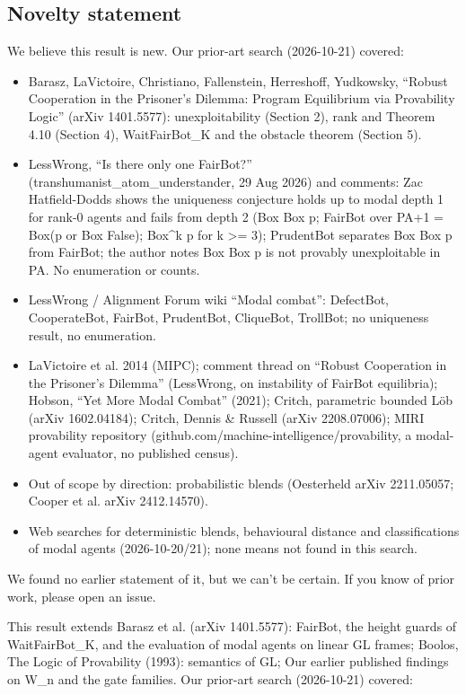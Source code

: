 \documentclass{article}
\begin{document}
\subsection*{Novelty statement}

We believe this result is new. Our prior-art search (2026-10-21) covered:

\begin{itemize}
\item Barasz, LaVictoire, Christiano, Fallenstein, Herreshoff, Yudkowsky, ``Robust Cooperation in the Prisoner's Dilemma: Program Equilibrium via Provability Logic'' (arXiv 1401.5577): unexploitability (Section 2), rank and Theorem 4.10 (Section 4), WaitFairBot\_K and the obstacle theorem (Section 5).
\item LessWrong, ``Is there only one FairBot?'' (transhumanist\_atom\_understander, 29 Aug 2026) and comments: Zac Hatfield-Dodds shows the uniqueness conjecture holds up to modal depth 1 for rank-0 agents and fails from depth 2 (Box Box p; FairBot over PA+1 = Box(p or Box False); Box\textasciicircum{}k p for k \textgreater{}= 3); PrudentBot separates Box Box p from FairBot; the author notes Box Box p is not provably unexploitable in PA. No enumeration or counts.
\item LessWrong / Alignment Forum wiki ``Modal combat'': DefectBot, CooperateBot, FairBot, PrudentBot, CliqueBot, TrollBot; no uniqueness result, no enumeration.
\item LaVictoire et al. 2014 (MIPC); comment thread on ``Robust Cooperation in the Prisoner's Dilemma'' (LessWrong, on instability of FairBot equilibria); Hobson, ``Yet More Modal Combat'' (2021); Critch, parametric bounded Löb (arXiv 1602.04184); Critch, Dennis \& Russell (arXiv 2208.07006); MIRI provability repository (github.com/machine-intelligence/provability, a modal-agent evaluator, no published census).
\item Out of scope by direction: probabilistic blends (Oesterheld arXiv 2211.05057; Cooper et al. arXiv 2412.14570).
\item Web searches for deterministic blends, behavioural distance and classifications of modal agents (2026-10-20/21); none means not found in this search.
\end{itemize}

We found no earlier statement of it, but we can't be certain. If you know of prior work, please open an issue.

This result extends Barasz et al. (arXiv 1401.5577): FairBot, the height guards of WaitFairBot\_K, and the evaluation of modal agents on linear GL frames; Boolos, The Logic of Provability (1993): semantics of GL; Our earlier published findings on W\_n and the gate families. Our prior-art search (2026-10-21) covered:
\end{document}
